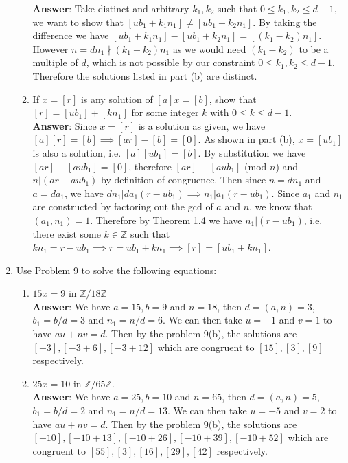 \documentclass{article}
\begin{document}
\begin{enumerate}
\begin{enumerate}
                        \textbf{Answer}: Take distinct and arbitrary $k_1,k_2$ such that $0\leq k_1,k_2\leq d-1$, we want to show that $[ub_1+k_1n_1]\neq [ub_1+k_2n_1]$. By taking the difference we have $[ub_1+k_1n_1]-[ub_1+k_2n_1]=[(k_1-k_2)n_1]$. However $n=dn_1\nmid (k_1-k_2)n_1$ as we would need $(k_1-k_2)$ to be a multiple of $d$, which is not possible by our constraint $0\leq k_1,k_2\leq d-1$. Therefore the solutions listed in part (b) are distinct.
                  \item If $x=[r]$ is any solution of $[a]x=[b]$, show that $[r]=[ub_1]+[kn_1]$ for some integer $k$ with $0\leq k\leq d-1$.\\
                        \textbf{Answer}: Since $x=[r]$ is a solution as given, we have $[a][r]=[b]\implies [ar]-[b]=[0]$. As shown in part (b), $x=[ub_1]$ is also a solution, i.e. $[a][ub_1]=[b]$. By substitution we have $[ar]-[aub_1]=[0]$, therefore $[ar]\equiv [aub_1]$ (mod $n$) and $n|(ar-aub_1)$ by definition of congruence. Then since $n=dn_1$ and $a=da_1$, we have $dn_1|da_1(r-ub_1)\implies n_1|a_1(r-ub_1)$. Since $a_1$ and $n_1$ are constructed by factoring out the gcd of $a$ and $n$, we know that $(a_1,n_1)=1$. Therefore by Theorem 1.4 we have $n_1|(r-ub_1)$, i.e. there exist some $k\in\mathbb{Z}$ such that $kn_1=r-ub_1\implies r=ub_1+kn_1\implies [r]=[ub_1+kn_1]$.
            \end{enumerate}
      \item Use Problem 9 to solve the following equations:
            \begin{enumerate}
                  \item $15x=9$ in $\mathbb{Z}/18\mathbb{Z}$\\
                        \textbf{Answer}: We have $a=15,b=9$ and $n=18$, then $d=(a,n)=3$, $b_1=b/d=3$ and $n_1=n/d=6$. We can then take $u=-1$ and $v=1$ to have $au+nv=d$. Then by the problem 9(b), the solutions are $[-3],[-3+6],[-3+12]$ which are congruent to $[15],[3],[9]$ respectively.
                  \item $25x=10$ in $\mathbb{Z}/65\mathbb{Z}$.\\
                        \textbf{Answer}: We have $a=25,b=10$ and $n=65$, then $d=(a,n)=5$, $b_1=b/d=2$ and $n_1=n/d=13$. We can then take $u=-5$ and $v=2$ to have $au+nv=d$. Then by the problem 9(b), the solutions are $[-10],[-10+13],[-10+26],[-10+39],[-10+52]$ which are congruent to $[55],[3],[16],[29],[42]$ respectively.
            \end{enumerate}
\end{enumerate}
\end{document}
